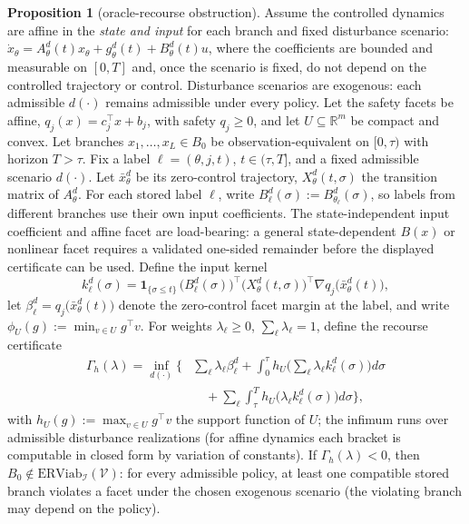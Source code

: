 \documentclass[10pt,twocolumn]{article}
\theoremstyle{definition}
\newtheorem{proposition}{Proposition}
\begin{document}
\begin{proposition}[oracle-recourse obstruction]\label{calc-prop:recourse}
Assume the controlled dynamics are affine in the \emph{state and input}
for each branch and fixed disturbance scenario:
\(\dot x_\theta = A_\theta^d(t)x_\theta + g_\theta^d(t)
+ B_\theta^d(t)u\), where the coefficients are bounded and measurable
on \([0,T]\) and, once the scenario is fixed, do not depend on the
controlled trajectory or control. Disturbance scenarios are exogenous:
each admissible \(d(\cdot)\) remains admissible under every policy.
Let the safety facets be affine,
\(q_j(x)=c_j^\top x+b_j\), with safety \(q_j\ge0\), and let
\(U\subseteq\mathbb{R}^m\) be compact and convex. Let branches
\(x_1,\dots,x_L\in B_0\) be observation-equivalent on \([0,\tau)\)
with horizon \(T>\tau\). Fix a label
\(\ell=(\theta,j,t)\), \(t\in(\tau,T]\), and a fixed admissible
scenario \(d(\cdot)\). Let \(\bar x_\theta^d\) be its zero-control
trajectory, \(X_\theta^d(t,\sigma)\) the transition matrix of
\(A_\theta^d\). For each stored label \(\ell\), write
\(B_\ell^d(\sigma):=B_{\theta_\ell}^d(\sigma)\), so labels from
different branches use their own input coefficients.
The state-independent input coefficient and affine facet are
load-bearing: a general state-dependent \(B(x)\) or nonlinear facet
requires a validated one-sided remainder before the displayed certificate
can be used.
Define the input kernel
\[k_\ell^d(\sigma) = \mathbf{1}_{\{\sigma \le t\}}\,
\big(B_\ell^d(\sigma)\big)^{\top}
\big(X_\theta^d(t, \sigma)\big)^{\top}
\nabla q_j\big(\bar x_\theta^d(t)\big),\]
let \(\beta_\ell^d = q_j\big(\bar x_\theta^d(t)\big)\) denote the
zero-control facet margin at the label, and write
\(\phi_U(g) := \min_{v \in U} g^{\top} v\). For weights
\(\lambda_\ell \ge 0\), \(\sum_\ell \lambda_\ell = 1\), define the recourse certificate \[\begin{aligned} \Gamma_{h}(\lambda) = \inf_{d(\cdot)} \Big\{ &\sum_{\ell} \lambda_{\ell} \beta_{\ell}^{d} + \int_0^{\tau} h_U\Big(\sum_{\ell} \lambda_\ell k_\ell^d(\sigma)\Big) d\sigma \\ &\quad + \sum_{\ell} \int_{\tau}^{T} h_U\big(\lambda_\ell k_\ell^d(\sigma)\big) d\sigma \Big\}, \end{aligned}\] with \(h_U(g) := \max_{v \in U} g^{\top} v\) the support function of \(U\); the infimum runs over admissible disturbance realizations (for affine dynamics each bracket is computable in closed form by variation of constants). If \(\Gamma_{h}(\lambda) < 0\), then \(B_0 \notin \mathrm{ERViab}_{\mathcal{I}}(\mathcal{V})\): for every admissible policy, at least one compatible stored branch violates a facet under the chosen exogenous scenario (the violating branch may depend on the policy).
\end{proposition}
\end{document}
